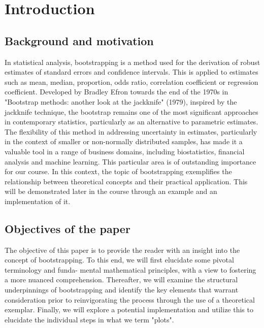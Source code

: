 
\chapter{Introduction} \label{Introduction}


\section{Background and motivation} \label{Background and motivation}
In statistical analysis, bootstrapping is a method used for the derivation of robust estimates of standard errors and confidence intervals. This is applied to estimates such as mean, median, proportion, odds ratio, correlation coefficient or regression coefficient. Developed by Bradley Efron towards the end of the 1970s in "Bootstrap methods: another look at the jackknife" (1979), inspired by the jackknife technique, the bootstrap remains one of the most significant approaches in contemporary statistics, particularly as an alternative to parametric estimates.
The flexibility of this method in addressing uncertainty in estimates, particularly in the context of smaller or non-normally distributed samples, has made it a valuable tool in a range of business domains, including biostatistics, financial analysis and machine learning. This particular area is of outstanding importance for our course.
In this context, the topic of bootstrapping exemplifies the relationship between theoretical concepts and their practical application. This will be demonstrated later in the course through an example and an implementation of it. 


\section{Objectives of the paper}
The objective of this paper is to provide the reader with an insight into the concept of
bootstrapping. To this end, we will first elucidate some pivotal terminology and funda-
mental mathematical principles, with a view to fostering a more nuanced comprehension.
Thereafter, we will examine the structural underpinnings of bootstrapping and identify the
key elements that warrant consideration prior to reinvigorating the process through the use
of a theoretical exemplar. Finally, we will explore a potential implementation and utilize
this to elucidate the individual steps in what we term "plots".


